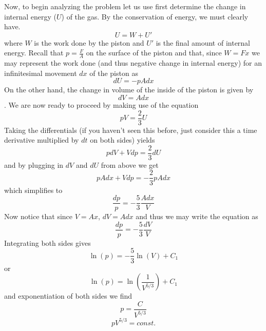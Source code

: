 \documentclass[12pt,letterpaper]{article}
\begin{document}
Now, to begin analyzing the problem let us use first determine the change in internal energy ($U$) of the gas. By the conservation of energy, we must clearly have.
\[ U = W + U' \]
where $W$ is the work done by the piston and $U'$ is the final amount of internal energy. Recall that $p=\frac{F}{A}$ on the surface of the piston and that, since $W=Fx$ we may represent the work done (and thus  negative change in internal energy) for an infinitesimal movement $dx$ of the piston as 
\[ dU=-pAdx \]
On the other hand, the change in volume of the inside of the piston is given by 
\[ dV=Adx \].
We are now ready to proceed by making use of the equation 
\[ pV = \frac{2}{3}U \]
Taking the differentials (if you haven't seen this before, just consider this a time derivative multiplied by $dt$ on both sides) yields
\[ pdV + Vdp = \frac{2}{3} dU \]
and by plugging in $dV$ and $dU$ from above we get
\[ pAdx + Vdp = -\frac{2}{3} pAdx \]
which simplifies to
\[ \frac{dp}{p} = -\frac{5}{3}\frac{Adx}{V} \]
Now notice that since $V=Ax$, $dV=Adx$ and thus we may write the equation as 
\[ \frac{dp}{p} = -\frac{5}{3}\frac{dV}{V} \]
Integrating both sides gives 
\[ \ln(p) = -\frac{5}{3}\ln(V) + C_1 \]
or
\[ \ln(p) = \ln\left(\frac{1}{V^{5/3}}\right)+C_1 \]
and exponentiation of both sides we find
\[ p = \frac{C}{V^{5/3}} \]
\[ pV^{5/3} = const. \]
\end{document}

